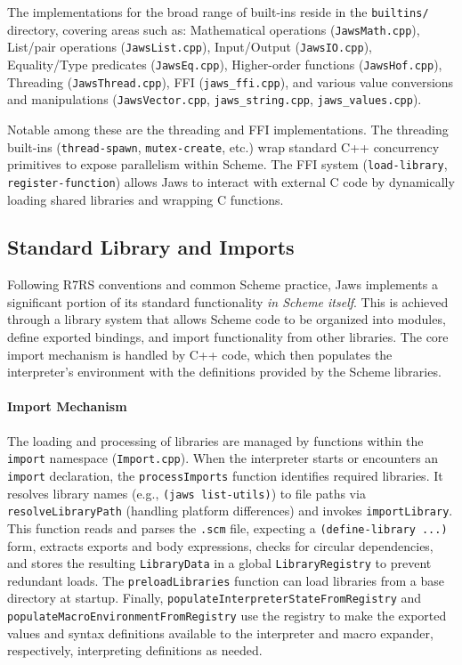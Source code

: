\documentclass[final]{cmpreport_02}
\begin{document}
The implementations for the broad range of built-ins reside in the \texttt{builtins/} directory, covering areas such as: Mathematical operations (\texttt{JawsMath.cpp}), List/pair operations (\texttt{JawsList.cpp}), Input/Output (\texttt{JawsIO.cpp}), Equality/Type predicates (\texttt{JawsEq.cpp}), Higher-order functions (\texttt{JawsHof.cpp}), Threading (\texttt{JawsThread.cpp}), FFI (\texttt{jaws\_ffi.cpp}), and various value conversions and manipulations (\texttt{JawsVector.cpp}, \texttt{jaws\_string.cpp}, \texttt{jaws\_values.cpp}).

Notable among these are the threading and FFI implementations. The threading built-ins (\texttt{thread-spawn}, \texttt{mutex-create}, etc.) wrap standard C++ concurrency primitives to expose parallelism within Scheme. The FFI system (\texttt{load-library}, \texttt{register-function}) allows Jaws to interact with external C code by dynamically loading shared libraries and wrapping C functions.

\subsection{Standard Library and Imports} %

Following R7RS conventions and common Scheme practice, Jaws implements a significant portion of its standard functionality \textit{in Scheme itself}. This is achieved through a library system that allows Scheme code to be organized into modules, define exported bindings, and import functionality from other libraries. The core import mechanism is handled by C++ code, which then populates the interpreter's environment with the definitions provided by the Scheme libraries.

\paragraph{Import Mechanism}
The loading and processing of libraries are managed by functions within the \texttt{import} namespace (\texttt{Import.cpp}). When the interpreter starts or encounters an \texttt{import} declaration, the \texttt{processImports} function identifies required libraries. It resolves library names (e.g., \texttt{(jaws list-utils)}) to file paths via \texttt{resolveLibraryPath} (handling platform differences) and invokes \texttt{importLibrary}. This function reads and parses the \texttt{.scm} file, expecting a \texttt{(define-library ...)} form, extracts exports and body expressions, checks for circular dependencies, and stores the resulting \texttt{LibraryData} in a global \texttt{LibraryRegistry} to prevent redundant loads. The \texttt{preloadLibraries} function can load libraries from a base directory at startup. Finally, \texttt{populateInterpreterStateFromRegistry} and \texttt{populateMacroEnvironmentFromRegistry} use the registry to make the exported values and syntax definitions available to the interpreter and macro expander, respectively, interpreting definitions as needed.
\end{document}
